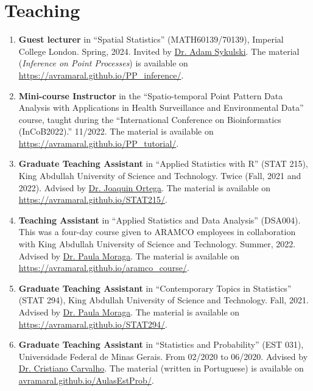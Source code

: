 \documentclass[10pt, ]{article}
\begin{document}
	\vspace{10pt}
	
	\vspace{-12pt}
	\section*{Teaching} \vspace{-5pt}
	
	\begin{enumerate}[noitemsep, topsep=0pt]
		\item \textbf{Guest lecturer} in ``Spatial Statistics'' (MATH60139/70139), Imperial College London. Spring, 2024. Invited by \href{https://www.imperial.ac.uk/people/adam.sykulski}{Dr. Adam Sykulski}. The material (\textit{Inference on Point Processes}) is available on \href{https://avramaral.github.io/PP_inference/}{\url{https://avramaral.github.io/PP_inference/}}.
		\item \textbf{Mini-course Instructor} in the ``Spatio-temporal Point Pattern Data Analysis with Applications in Health Surveillance and Environmental Data'' course, taught during the ``International Conference on Bioinformatics (InCoB2022).'' 11/2022. The material is available on  \href{https://avramaral.github.io/PP_tutorial/}{\url{https://avramaral.github.io/PP_tutorial/}}.
		
		\item \textbf{Graduate Teaching Assistant} in ``Applied Statistics with R'' (STAT 215), King Abdullah University of Science and Technology. Twice (Fall, 2021 and 2022). Advised by \href{https://cemse.kaust.edu.sa/people/person/joaquin-ortega-sanchez}{Dr. Joaquin Ortega}. The material is available on \href{https://avramaral.github.io/STAT215/}{\url{https://avramaral.github.io/STAT215/}}.
		
		\item \textbf{Teaching Assistant} in ``Applied Statistics and Data Analysis'' (DSA004). This was a four-day course given to ARAMCO employees in collaboration with King Abdullah University of Science and Technology. Summer, 2022. Advised by \href{https://www.paulamoraga.com/}{Dr. Paula Moraga}. The material is available on \href{https://avramaral.github.io/aramco\_course/}{\url{https://avramaral.github.io/aramco\_course/}}.
		
		\item \textbf{Graduate Teaching Assistant} in ``Contemporary Topics in Statistics'' (STAT 294), King Abdullah University of Science and Technology. Fall, 2021. Advised by \href{https://www.paulamoraga.com/}{Dr. Paula Moraga}. The material is available on \href{https://avramaral.github.io/STAT294/}{\url{https://avramaral.github.io/STAT294/}}.
		
		\item \textbf{Graduate Teaching Assistant} in ``Statistics and Probability'' (EST 031), Universidade Federal de Minas Gerais. From 02/2020 to 06/2020. Advised by \href{http://www.est.ufmg.br/~cristianocs/}{Dr. Cristiano Carvalho}. The material (written in Portuguese) is available on \href{https://avramaral.github.io/AulasEstProb/}{\url{avramaral.github.io/AulasEstProb/}}.
	\end{enumerate}
	
\end{document}
